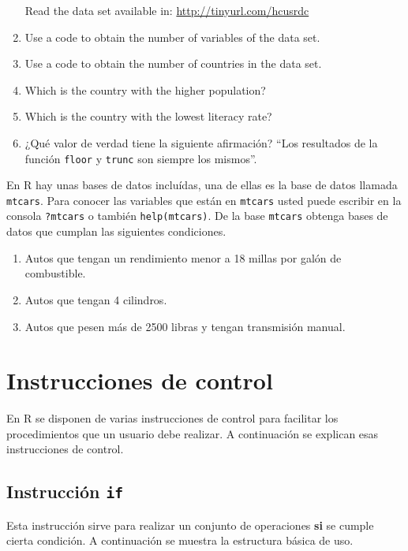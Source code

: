 \documentclass[10pt,]{krantz}
\providecommand{\tightlist}{%
  \setlength{\itemsep}{0pt}\setlength{\parskip}{0pt}}
\begin{document}
\begin{enumerate}
  Read the data set available in: \url{http://tinyurl.com/hcusrdc}
\item
  Use a code to obtain the number of variables of the data set.
\item
  Use a code to obtain the number of countries in the data set.
\item
  Which is the country with the higher population?
\item
  Which is the country with the lowest literacy rate?
\item
  ¿Qué valor de verdad tiene la siguiente afirmación? ``Los resultados
  de la función \texttt{floor} y \texttt{trunc} son siempre los
  mismos''.
\end{enumerate}

En R hay unas bases de datos incluídas, una de ellas es la base de datos
llamada \texttt{mtcars}. Para conocer las variables que están en
\texttt{mtcars} usted puede escribir en la consola \texttt{?mtcars} o
también \texttt{help(mtcars)}. De la base \texttt{mtcars} obtenga bases
de datos que cumplan las siguientes condiciones.

\begin{enumerate}
\def\labelenumi{\arabic{enumi}.}
\setcounter{enumi}{21}
\tightlist
\item
  Autos que tengan un rendimiento menor a 18 millas por galón de
  combustible.
\item
  Autos que tengan 4 cilindros.
\item
  Autos que pesen más de 2500 libras y tengan transmisión manual.
\end{enumerate}

\chapter{Instrucciones de control}\label{bucles}

En R se disponen de varias instrucciones de control para facilitar los
procedimientos que un usuario debe realizar. A continuación se explican
esas instrucciones de control.

\section{\texorpdfstring{Instrucción \texttt{if}
}{Instrucción if }}\label{instruccion-if}

Esta instrucción sirve para realizar un conjunto de operaciones
\textbf{si} se cumple cierta condición. A continuación se muestra la
estructura básica de uso.
\end{document}
